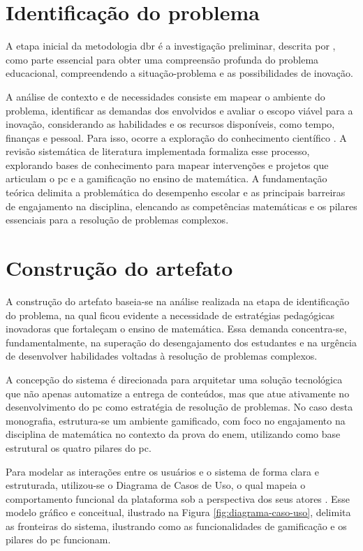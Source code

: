 \section{Identificação do problema}

A etapa inicial da metodologia \gls{dbr} é a investigação preliminar, descrita por
, como parte essencial para obter uma compreensão profunda
do problema educacional, compreendendo a situação-problema e as
possibilidades de inovação. 

A análise de contexto e de necessidades consiste em mapear o ambiente do
problema, identificar as demandas dos envolvidos e avaliar o escopo viável para
a inovação, considerando as habilidades e os recursos disponíveis, como tempo,
finanças e pessoal. Para isso, ocorre a exploração do conhecimento
científico \cite{obrien2018practical}. A revisão sistemática de literatura
implementada formaliza esse processo, explorando bases de conhecimento para
mapear intervenções e projetos que articulam o \gls{pc} e a gamificação no ensino de
matemática. A fundamentação teórica delimita a problemática do desempenho
escolar e as principais barreiras de engajamento na disciplina, elencando as
competências matemáticas e os pilares essenciais para a resolução de problemas
complexos.

\section{Construção do artefato}
\label{sec:construcao_artefato}
A construção do artefato baseia-se na análise realizada na etapa de
identificação do problema, na qual ficou evidente a necessidade de estratégias
pedagógicas inovadoras que fortaleçam o ensino de matemática. Essa demanda
concentra-se, fundamentalmente, na superação do desengajamento dos estudantes e
na urgência de desenvolver habilidades voltadas à resolução de problemas
complexos. 

A concepção do sistema é direcionada para arquitetar uma solução tecnológica que
não apenas automatize a entrega de conteúdos, mas que atue ativamente no
desenvolvimento do \gls{pc} como estratégia de resolução de problemas. No caso desta
monografia, estrutura-se um ambiente gamificado, com foco no engajamento na
disciplina de matemática no contexto da prova do \gls{enem}, utilizando como base
estrutural os quatro pilares do \gls{pc}. 

Para modelar as interações entre os usuários e o sistema de forma clara e
estruturada, utilizou-se o Diagrama de Casos de Uso, o qual mapeia o
comportamento funcional da plataforma sob a perspectiva dos seus atores
\cite{sommerville2011software}. Esse modelo gráfico e conceitual, ilustrado na
Figura \ref{fig:diagrama-caso-uso}, delimita as fronteiras do sistema,
ilustrando como as funcionalidades de gamificação e os pilares do \gls{pc}
funcionam.
 
